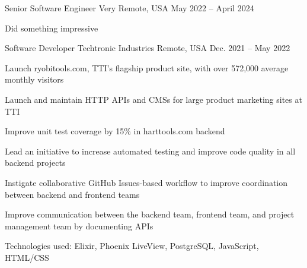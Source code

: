
\begin{cventries}

  \cventry
  {Senior Software Engineer} %
  {Very} %
  {Remote, USA} %
  {May 2022 -- April 2024} %
  {
    \begin{cvitems}
      \item {Did something impressive}
      \end{cvitems}
    }

    \cventry
    {Software Developer} %
    {Techtronic Industries} %
    {Remote, USA} %
    {Dec. 2021 -- May 2022} %
    {
      \begin{cvitems}
      \item Launch ryobitools.com, TTI’s flagship product site, with over 572,000 average monthly visitors
      \item Launch and maintain HTTP APIs and CMSs for large product marketing sites at TTI
      \item Improve unit test coverage by 15\% in harttools.com backend
      \item Lead an initiative to increase automated testing and improve code quality in all backend projects
      \item Instigate collaborative GitHub Issues-based workflow to improve coordination between backend and frontend teams
      \item Improve communication between the backend team, frontend team, and project management team by documenting APIs
      \item Technologies used: Elixir, Phoenix LiveView, PostgreSQL, JavaScript, HTML/CSS
      \end{cvitems}
    }

  \end{cventries}
